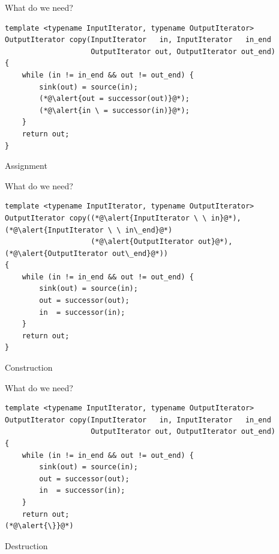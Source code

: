 \documentclass[aspectratio=169]{beamer}
\begin{document}

\begin{frame}[fragile]{What do we need?}
  \footnotesize
\begin{lstlisting}
template <typename InputIterator, typename OutputIterator>
OutputIterator copy(InputIterator   in, InputIterator   in_end
                    OutputIterator out, OutputIterator out_end)
{
    while (in != in_end && out != out_end) {
        sink(out) = source(in);
        (*@\alert{out = successor(out)}@*);
        (*@\alert{in \ = successor(in)}@*);
    }
    return out;
}
\end{lstlisting}
  \begin{center}
    \Large Assignment
  \end{center}
\end{frame}


\begin{frame}[fragile]{What do we need?}
  \footnotesize
\begin{lstlisting}
template <typename InputIterator, typename OutputIterator>
OutputIterator copy((*@\alert{InputIterator \ \ in}@*), (*@\alert{InputIterator \ \ in\_end}@*)
                    (*@\alert{OutputIterator out}@*), (*@\alert{OutputIterator out\_end}@*))
{
    while (in != in_end && out != out_end) {
        sink(out) = source(in);
        out = successor(out);
        in  = successor(in);
    }
    return out;
}
\end{lstlisting}
  \begin{center}
    \Large Construction
  \end{center}
\end{frame}


\begin{frame}[fragile]{What do we need?}
  \footnotesize
\begin{lstlisting}
template <typename InputIterator, typename OutputIterator>
OutputIterator copy(InputIterator   in, InputIterator   in_end
                    OutputIterator out, OutputIterator out_end)
{
    while (in != in_end && out != out_end) {
        sink(out) = source(in);
        out = successor(out);
        in  = successor(in);
    }
    return out;
(*@\alert{\}}@*)
\end{lstlisting}
  \begin{center}
    \Large Destruction
  \end{center}
\end{frame}
\end{document}
